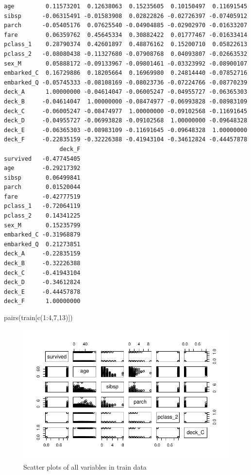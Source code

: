 \documentclass[
  letterpaper,
  DIV=11,
  numbers=noendperiod]{scrartcl}
\newenvironment{Shaded}{\begin{snugshade}}{\end{snugshade}}
\newcommand{\DecValTok}[1]{\textcolor[rgb]{0.68,0.00,0.00}{#1}}
\newcommand{\FunctionTok}[1]{\textcolor[rgb]{0.28,0.35,0.67}{#1}}
\newcommand{\NormalTok}[1]{\textcolor[rgb]{0.00,0.23,0.31}{#1}}
\newcommand{\SpecialCharTok}[1]{\textcolor[rgb]{0.37,0.37,0.37}{#1}}
\begin{document}
\begin{verbatim}
age         0.11573201  0.12638063  0.15235605  0.10150497  0.11691545
sibsp      -0.06315491 -0.01583908  0.02822826 -0.02726397 -0.07405912
parch      -0.05405176  0.07625540 -0.04904885 -0.02902970 -0.01633207
fare        0.06359762  0.45645334  0.30882422  0.01777467 -0.01633414
pclass_1    0.28790374  0.42601897  0.48876162  0.15200710  0.05822613
pclass_2   -0.08080438 -0.11327680 -0.07908768  0.04093807 -0.02663532
sex_M       0.05888172 -0.09133967 -0.09801461 -0.03323992 -0.08900107
embarked_C  0.16729886  0.18205664  0.16969980  0.24814440 -0.07852716
embarked_Q -0.05745333 -0.08108169 -0.08023736 -0.07224766 -0.08770239
deck_A      1.00000000 -0.04614047 -0.06005247 -0.04955727 -0.06365303
deck_B     -0.04614047  1.00000000 -0.08474977 -0.06993828 -0.08983109
deck_C     -0.06005247 -0.08474977  1.00000000 -0.09102568 -0.11691645
deck_D     -0.04955727 -0.06993828 -0.09102568  1.00000000 -0.09648328
deck_E     -0.06365303 -0.08983109 -0.11691645 -0.09648328  1.00000000
deck_F     -0.22835159 -0.32226388 -0.41943104 -0.34612824 -0.44457878
                deck_F
survived   -0.47745405
age        -0.29217392
sibsp       0.06499841
parch       0.01520044
fare       -0.42777519
pclass_1   -0.72064119
pclass_2    0.14341225
sex_M       0.15235799
embarked_C -0.31968879
embarked_Q  0.21273851
deck_A     -0.22835159
deck_B     -0.32226388
deck_C     -0.41943104
deck_D     -0.34612824
deck_E     -0.44457878
deck_F      1.00000000
\end{verbatim}

\begin{Shaded}
\begin{Highlighting}[]
\FunctionTok{pairs}\NormalTok{(train[}\FunctionTok{c}\NormalTok{(}\DecValTok{1}\SpecialCharTok{:}\DecValTok{4}\NormalTok{,}\DecValTok{7}\NormalTok{,}\DecValTok{13}\NormalTok{)])}
\end{Highlighting}
\end{Shaded}

\begin{figure}[H]

{\centering \includegraphics{FinalProject_files/figure-pdf/unnamed-chunk-14-1.pdf}

}

\caption{Scatter plots of all variables in train data}

\end{figure}%
\end{document}
